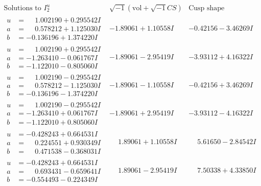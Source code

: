 \documentclass[1p]{elsarticle_modified}
\theoremstyle{definition}
\newcommand{\I}{\sqrt{-1}}
\begin{document}
$$\begin{array}{c|c|c}  
\text{Solutions to }I^u_{2}& \I (\text{vol} + \sqrt{-1}CS) & \text{Cusp shape}\\
 \hline 
\begin{aligned}
u &= \phantom{-}1.002190 + 0.295542 I \\
a &= \phantom{-}0.578212 + 1.125030 I \\
b &= -0.136196 + 1.374220 I\end{aligned}
 & -1.89061 + 1.10558 I & -0.42156 - 3.46269 I \\ \hline\begin{aligned}
u &= \phantom{-}1.002190 + 0.295542 I \\
a &= -1.263410 - 0.061767 I \\
b &= -1.122010 - 0.805060 I\end{aligned}
 & -1.89061 - 2.95419 I & -3.93112 + 4.16322 I \\ \hline\begin{aligned}
u &= \phantom{-}1.002190 - 0.295542 I \\
a &= \phantom{-}0.578212 - 1.125030 I \\
b &= -0.136196 - 1.374220 I\end{aligned}
 & -1.89061 - 1.10558 I & -0.42156 + 3.46269 I \\ \hline\begin{aligned}
u &= \phantom{-}1.002190 - 0.295542 I \\
a &= -1.263410 + 0.061767 I \\
b &= -1.122010 + 0.805060 I\end{aligned}
 & -1.89061 + 2.95419 I & -3.93112 - 4.16322 I \\ \hline\begin{aligned}
u &= -0.428243 + 0.664531 I \\
a &= \phantom{-}0.224551 + 0.930349 I \\
b &= \phantom{-}0.471538 - 0.368031 I\end{aligned}
 & \phantom{-}1.89061 + 1.10558 I & \phantom{-}5.61650 - 2.84542 I \\ \hline\begin{aligned}
u &= -0.428243 + 0.664531 I \\
a &= \phantom{-}0.693431 - 0.659641 I \\
b &= -0.554493 - 0.224349 I\end{aligned}
 & \phantom{-}1.89061 - 2.95419 I & \phantom{-}7.50338 + 4.33850 I \\ \hline\begin{aligned}

\end{aligned}
\end{array}$$
\end{document}
